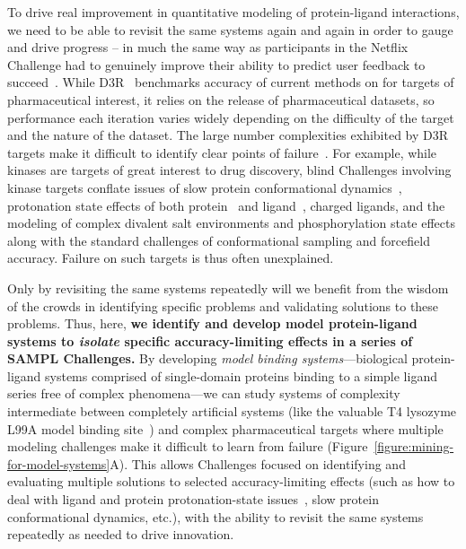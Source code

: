 \documentclass[11pt]{article}
\begin{document}
To drive real improvement in quantitative modeling of protein-ligand interactions, we need to be able to revisit the same systems again and again in order to gauge and drive progress -- in much the same way as participants in the Netflix Challenge had to genuinely improve their ability to predict user feedback to succeed~\cite{Bell:2010:CHANCE}.
While D3R~\cite{Gathiaka:2016:JComputAidedMolDes} benchmarks accuracy of current methods on for targets of pharmaceutical interest, it relies on the release of pharmaceutical datasets, so performance each iteration varies widely depending on the difficulty of the target and the nature of the dataset.
The large number complexities exhibited by D3R targets make it difficult to identify clear points of failure~\cite{ignjatovic_binding-affinity_2016, deng_large_2016, sunseri_d3r_2016, Gathiaka:2016:JComputAidedMolDes}.
For example, while kinases are targets of great interest to drug discovery, blind Challenges involving kinase targets conflate issues of slow protein conformational dynamics~\cite{Lin:2013:Proc.Natl.Acad.Sci.}, protonation state effects of both protein~\cite{Shan:2009:PNAS} and ligand~\cite{Szakacs:2005:JournalofMedicinalChemistry,Grante:2014:SpectrochimicaActaPartA:MolecularandBiomolecularSpectroscopy}, charged ligands, and the modeling of complex divalent salt environments and phosphorylation state effects along with the standard challenges of conformational sampling and forcefield accuracy.
Failure on such targets is thus often unexplained. 

Only by revisiting the same systems repeatedly will we benefit from the wisdom of the crowds in identifying specific problems and validating solutions to these problems. 
Thus, here, {\bf we identify and develop model protein-ligand systems to \emph{isolate} specific accuracy-limiting effects in a series of SAMPL Challenges.}
By developing \emph{model binding systems}---biological protein-ligand systems comprised of single-domain proteins binding to a simple ligand series free of complex phenomena---we can study systems of complexity intermediate between completely artificial systems (like the valuable T4 lysozyme L99A model binding site~\cite{mobley_predicting_2007,merski_homologous_2015, Mobley:2017:AnnualReviewofBiophysics}) and complex pharmaceutical targets where multiple modeling challenges make it difficult to learn from failure (Figure~\ref{figure:mining-for-model-systems}A).
This allows Challenges focused on identifying and evaluating multiple solutions to selected accuracy-limiting effects (such as how to deal with ligand and protein protonation-state issues~\cite{Onufriev:2013:QuarterlyReviewsofBiophysics}, slow protein conformational dynamics, etc.), with the ability to revisit the same systems repeatedly as needed to drive innovation.
\end{document}
